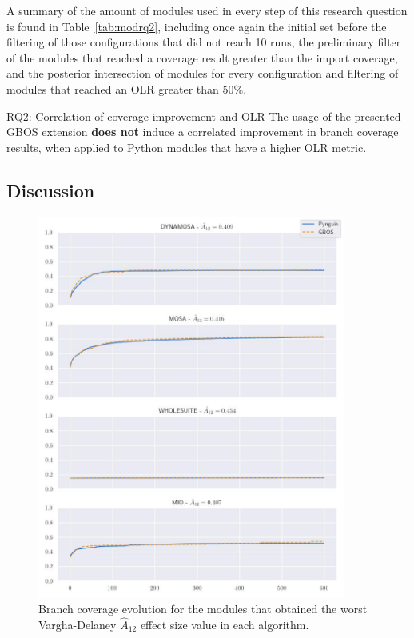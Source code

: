\documentclass[%
  chapterprefix=false,%
  open=right,%
  twoside=true,%
  paper=a4,%
  logofile={Figures/logo.png},%
  thesistype=master,%
  UKenglish,%
]{se2thesis}
\begin{document}
A summary of the amount of modules used in every step of this research question is found in Table~\ref{tab:modrq2}, including once again the initial set before the filtering of those configurations that did not reach 10 runs, the preliminary filter of the modules that reached a coverage result greater than the import coverage, and the posterior intersection of modules for every configuration and filtering of modules that reached an OLR greater than \(50\%\).

\begin{table}[t]
  \centering
  
\caption{Amount of modules used while analysing each experimental configuration for the answering of Research Question 2.}\label{tab:modrq2}
\end{table}

\begin{summary}{RQ2: Correlation of coverage improvement and OLR}
  The usage of the presented GBOS extension \textbf{does not} induce a correlated improvement in branch coverage results, when applied to Python modules that have a higher OLR metric.
\end{summary}

\subsection*{Discussion}

\begin{figure}[ptbh]
  \centering
  \includegraphics[width=0.9\textwidth]{Figures/Results/worstA12.jpg}
  \caption{Branch coverage evolution for the modules that obtained the worst Vargha-Delaney \(\hat{A}_{12}\) effect size value in each algorithm.}\label{fig:worsta12}
\end{figure}
\end{document}
